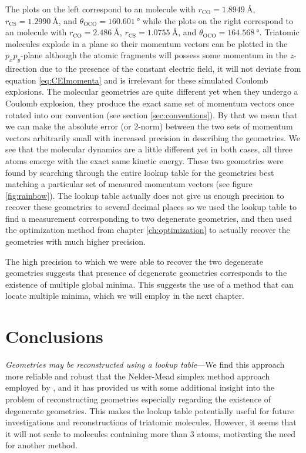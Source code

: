 The plots on the left correspond to an  molecule with $r_\textrm{CO} = \SI{1.8949}{\angstrom}$, $r_\textrm{CS} = \SI{1.2990}{\angstrom}$, and $\theta_\mathrm{OCO} = \SI{160.601}{\degree}$ while the plots on the right correspond to an  molecule with $r_\textrm{CO} = \SI{2.486}{\angstrom}$, $r_\textrm{CS} = \SI{1.0755}{\angstrom}$, and $\theta_\mathrm{OCO} = \SI{164.568}{\degree}$. Triatomic molecules explode in a plane so their momentum vectors can be plotted in the $p_xp_y$-plane although the atomic fragments will possess some momentum in the $z$-direction due to the presence of the constant electric field, it will not deviate from equation \eqref{eq:CEImomenta} and is irrelevant for these simulated Coulomb explosions. The molecular geometries are quite different yet when they undergo a Coulomb explosion, they produce the exact same set of momentum vectors once rotated into our convention (see section \ref{sec:conventions}). By that we mean that we can make the absolute error (or $2$-norm) between the two sets of momentum vectors arbitrarily small with increased precision in describing the geometries. We see that the molecular dynamics are a little different yet in both cases, all three atoms emerge with the exact same kinetic energy. These two geometries were found by searching through the entire lookup table for the geometries best matching a particular set of measured momentum vectors (see figure \ref{fig:rainbow}). The lookup table actually does not give us enough precision to recover these geometries to several decimal places so we used the lookup table to find a measurement corresponding to two degenerate geometries, and then used the optimization method from chapter \ref{ch:optimization} to actually recover the geometries with much higher precision.

The high precision to which we were able to recover the two degenerate geometries suggests that presence of degenerate geometries corresponds to the existence of multiple global minima. This suggests the use of a method that can locate multiple minima, which we will employ in the next chapter.

\section{Conclusions}
\emph{Geometries may be reconstructed using a lookup table}---We find this approach more reliable and robust that the Nelder-Mead simplex method approach employed by \citet{Brichta09}, and it has provided us with some additional insight into the problem of reconstructing geometries especially regarding the existence of degenerate geometries. This makes the lookup table potentially useful for future investigations and reconstructions of triatomic molecules. However, it seems that it will not scale to molecules containing more than $3$ atoms, motivating the need for another method.


